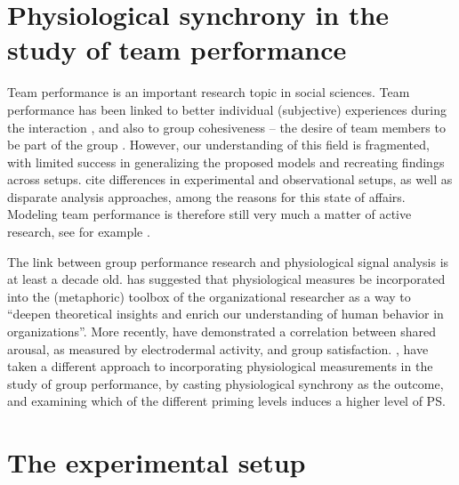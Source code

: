 \documentclass[a4paper, 11pt]{article}      %
\begin{document}
\section{Physiological synchrony in the study of team performance}
Team performance is an important research topic in social sciences. Team performance has been linked to better individual (subjective) experiences during the interaction \citep{lodahl1961psychometric}, and also to group cohesiveness -- the desire of team members to be part of the group \citep{cartwright1968nature}. However, our understanding of this field is fragmented, with limited success in generalizing the proposed models and recreating findings across setups. \citet{beal2003cohesion} cite differences in experimental and observational setups, as well as disparate analysis approaches, among the reasons for this state of affairs. Modeling team performance is therefore still very much a matter of active research, see for example \citet{collins2019explorations}.

The link between group performance research and physiological signal analysis is at least a decade old. \cite{akinola2010measuring} has suggested that physiological measures be incorporated into the (metaphoric) toolbox of the organizational researcher as a way to \enquote{deepen theoretical insights and enrich our understanding of human behavior in organizations}. More recently, \cite{chikersal2017deep} have demonstrated a correlation between shared arousal, as measured by electrodermal activity, and group satisfaction. \cite{danyluck2018intergroup}, have taken a different approach to incorporating physiological measurements in the study of group performance, by casting physiological synchrony as the outcome, and examining which of the different priming levels induces a higher level of PS. 

\section{The experimental setup}
\end{document}
